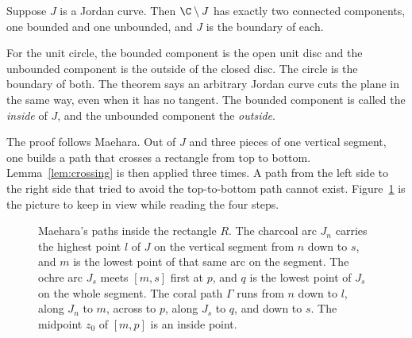 \begin{theorem}\label{thm:jordan}
Suppose $J$ is a Jordan curve. Then $\C\setminus J$ has exactly two connected components, one bounded and one unbounded, and $J$ is the boundary of each.
\end{theorem}

For the unit circle, the bounded component is the open unit disc and the unbounded component is the outside of the closed disc. The circle is the boundary of both. The theorem says an arbitrary Jordan curve cuts the plane in the same way, even when it has no tangent. The bounded component is called the \emph{inside} of $J$, and the unbounded component the \emph{outside}.

The proof follows Maehara. Out of $J$ and three pieces of one vertical segment, one builds a path that crosses a rectangle from top to bottom. Lemma~\ref{lem:crossing} is then applied three times. A path from the left side to the right side that tried to avoid the top-to-bottom path cannot exist. Figure~\ref{fig:jordan} is the picture to keep in view while reading the four steps.

\begin{figure}[ht]
\centering
{}
\caption{Maehara's paths inside the rectangle $R$. The charcoal arc $J_n$ carries the highest point $l$ of $J$ on the vertical segment from $n$ down to $s$, and $m$ is the lowest point of that same arc on the segment. The ochre arc $J_s$ meets $[m,s]$ first at $p$, and $q$ is the lowest point of $J_s$ on the whole segment. The coral path $\Gamma$ runs from $n$ down to $l$, along $J_n$ to $m$, across to $p$, along $J_s$ to $q$, and down to $s$. The midpoint $z_0$ of $[m,p]$ is an inside point.}
\label{fig:jordan}
\end{figure}

